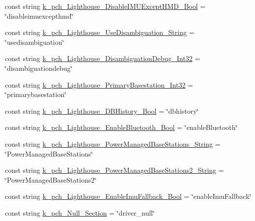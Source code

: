 \begin{DoxyCompactItemize}
\item 
const string \mbox{\hyperlink{class_valve_1_1_v_r_1_1_open_v_r_a125d0f653cc7aaf2be0a7bbb5c266369}{k\+\_\+pch\+\_\+\+Lighthouse\+\_\+\+Disable\+I\+M\+U\+Except\+H\+M\+D\+\_\+\+Bool}} = \char`\"{}disableimuexcepthmd\char`\"{}
\item 
const string \mbox{\hyperlink{class_valve_1_1_v_r_1_1_open_v_r_a9b6c7b9244726fef2863041c67f9a79e}{k\+\_\+pch\+\_\+\+Lighthouse\+\_\+\+Use\+Disambiguation\+\_\+\+String}} = \char`\"{}usedisambiguation\char`\"{}
\item 
const string \mbox{\hyperlink{class_valve_1_1_v_r_1_1_open_v_r_a7fa77a04f427defeabbd8923d7cbe97b}{k\+\_\+pch\+\_\+\+Lighthouse\+\_\+\+Disambiguation\+Debug\+\_\+\+Int32}} = \char`\"{}disambiguationdebug\char`\"{}
\item 
const string \mbox{\hyperlink{class_valve_1_1_v_r_1_1_open_v_r_a3e27139c3a39530cf5d9ad42128e17bb}{k\+\_\+pch\+\_\+\+Lighthouse\+\_\+\+Primary\+Basestation\+\_\+\+Int32}} = \char`\"{}primarybasestation\char`\"{}
\item 
const string \mbox{\hyperlink{class_valve_1_1_v_r_1_1_open_v_r_ac6d635adb70eabdfb822b9e278594107}{k\+\_\+pch\+\_\+\+Lighthouse\+\_\+\+D\+B\+History\+\_\+\+Bool}} = \char`\"{}dbhistory\char`\"{}
\item 
const string \mbox{\hyperlink{class_valve_1_1_v_r_1_1_open_v_r_ad04a088975dfea94ba6fa8d2b0f29c22}{k\+\_\+pch\+\_\+\+Lighthouse\+\_\+\+Enable\+Bluetooth\+\_\+\+Bool}} = \char`\"{}enable\+Bluetooth\char`\"{}
\item 
const string \mbox{\hyperlink{class_valve_1_1_v_r_1_1_open_v_r_ae5604cf96057818879d1b5735000c5be}{k\+\_\+pch\+\_\+\+Lighthouse\+\_\+\+Power\+Managed\+Base\+Stations\+\_\+\+String}} = \char`\"{}Power\+Managed\+Base\+Stations\char`\"{}
\item 
const string \mbox{\hyperlink{class_valve_1_1_v_r_1_1_open_v_r_a8d55e904be7f0ad357b0728060788a9a}{k\+\_\+pch\+\_\+\+Lighthouse\+\_\+\+Power\+Managed\+Base\+Stations2\+\_\+\+String}} = \char`\"{}Power\+Managed\+Base\+Stations2\char`\"{}
\item 
const string \mbox{\hyperlink{class_valve_1_1_v_r_1_1_open_v_r_a99c3437b4f05c33d135e09f6fb501683}{k\+\_\+pch\+\_\+\+Lighthouse\+\_\+\+Enable\+Imu\+Fallback\+\_\+\+Bool}} = \char`\"{}enable\+Imu\+Fallback\char`\"{}
\item 
const string \mbox{\hyperlink{class_valve_1_1_v_r_1_1_open_v_r_a6d953a9c3a206f99706adaa855d26620}{k\+\_\+pch\+\_\+\+Null\+\_\+\+Section}} = \char`\"{}driver\+\_\+null\char`\"{}
\item 

\end{DoxyCompactItemize}
